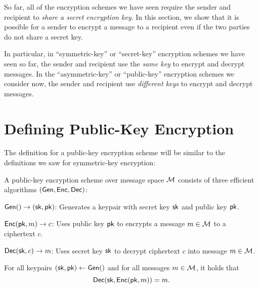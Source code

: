 
So far, all of the encryption schemes we have seen
require the sender and recipient to 
\emph{share a secret encryption key}.
In this section, we show that it is possible for
a sender to encrypt a message to a recipient even
if the two parties do not share a secret key.

In particular, in ``symmetric-key'' or ``secret-key'' encryption
schemes we have seen so far, the sender and recipient use the \emph{same key}
to encrypt and decrypt messages.
In the ``asymmetric-key'' or ``public-key'' encryption schemes
we consider now, the sender and recipient use \emph{different keys}
to encrypt and decrypt messages.

\section{Defining Public-Key Encryption}
The definition for a public-key encryption scheme will be similar to the 
definitions we saw for symmetric-key encryption:

\begin{definition}
	A public-key encryption scheme over message space $\mathcal{M}$ 
  consists of three efficient algorithms $(\mathsf{Gen}, \mathsf{Enc}, \mathsf{Dec})$:
	\begin{compactitem}
    \item $\mathsf{Gen}() \to ({\mathsf{sk}}, \mathsf{pk})$: Generates a keypair with secret key ${\mathsf{sk}}$ and public key $\mathsf{pk}$.
    \item $\mathsf{Enc}(\mathsf{pk}, m) \to c$: Uses public key $\mathsf{pk}$ to encrypts a message $m \in \mathcal{M}$ 
            to a ciphertext $c$.
    \item $\mathsf{Dec}({\mathsf{sk}}, c) \to m$: Uses secret key ${\mathsf{sk}}$ to decrypt ciphertext $c$ into message $m \in \mathcal{M}$.
	\end{compactitem}
\end{definition}

\begin{definition}
For all keypairs $({\mathsf{sk}}, \mathsf{pk}) \gets \mathsf{Gen}()$ and for all messages $m \in \mathcal{M}$,
it holds that $$\mathsf{Dec}({\mathsf{sk}}, \mathsf{Enc}(\mathsf{pk}, m)) = m.$$
\end{definition}


